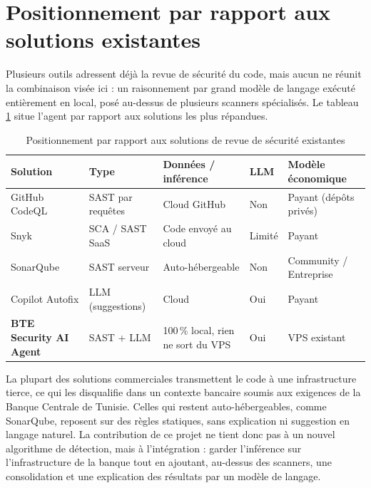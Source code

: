 \section{Positionnement par rapport aux solutions existantes}

    Plusieurs outils adressent déjà la revue de sécurité du code, mais aucun ne réunit
    la combinaison visée ici : un raisonnement par grand modèle de langage exécuté
    entièrement en local, posé au-dessus de plusieurs scanners spécialisés. Le tableau
    \ref{tab:related_work} situe l'agent par rapport aux solutions les plus répandues.

    \begin{table}[H]
    \centering
    \footnotesize
    \begin{tabular}{|m{3cm}|m{2.6cm}|m{3cm}|m{1.8cm}|m{2.4cm}|}
    \hline
    \textbf{Solution} & \textbf{Type} & \textbf{Données / inférence} & \textbf{LLM} & \textbf{Modèle économique} \\
    \hline
    GitHub CodeQL \cite{CodeQL} & SAST par requêtes & Cloud GitHub & Non & Payant (dépôts privés) \\
    \hline
    Snyk \cite{Snyk} & SCA / SAST SaaS & Code envoyé au cloud & Limité & Payant \\
    \hline
    SonarQube \cite{SonarQube} & SAST serveur & Auto-hébergeable & Non & Community / Entreprise \\
    \hline
    Copilot Autofix \cite{CopilotAutofix} & LLM (suggestions) & Cloud & Oui & Payant \\
    \hline
    \textbf{BTE Security AI Agent} & SAST + LLM & 100\,\% local, rien ne sort du VPS & Oui & VPS existant \\
    \hline
    \end{tabular}
    \caption{Positionnement par rapport aux solutions de revue de sécurité existantes}
    \label{tab:related_work}
    \end{table}

    La plupart des solutions commerciales transmettent le code à une infrastructure
    tierce, ce qui les disqualifie dans un contexte bancaire soumis aux exigences de la
    Banque Centrale de Tunisie. Celles qui restent auto-hébergeables, comme SonarQube,
    reposent sur des règles statiques, sans explication ni suggestion en langage
    naturel. La contribution de ce projet ne tient donc pas à un nouvel algorithme de
    détection, mais à l'intégration : garder l'inférence sur l'infrastructure de la
    banque tout en ajoutant, au-dessus des scanners, une consolidation et une
    explication des résultats par un modèle de langage.

